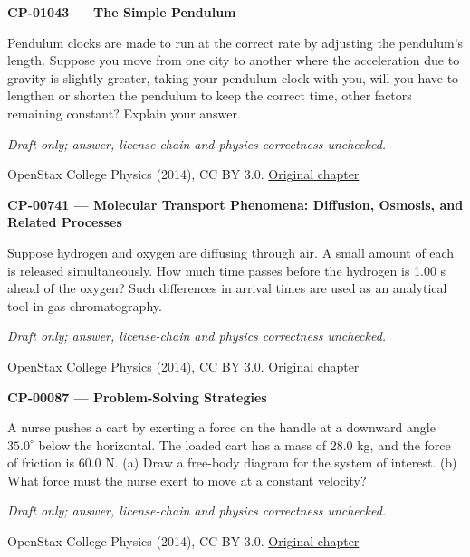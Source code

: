 \par\medskip
\noindent\textbf{CP-01043 — The Simple Pendulum}
\par Pendulum clocks are made to run at the correct rate by adjusting the pendulum’s length. Suppose you move from one city to another where the acceleration due to gravity is slightly greater, taking your pendulum clock with you, will you have to lengthen or shorten the pendulum to keep the correct time, other factors remaining constant? Explain your answer.
\par\smallskip
\textit{Draft only; answer, license-chain and physics correctness unchecked.}
\par{\footnotesize OpenStax College Physics (2014), CC BY 3.0. \href{https://github.com/philschatz/physics-book/blob/a7efaa7e221fab1694022d8bb98b83a73ee31d3d/contents/m42243.md}{Original chapter}}\par\normalsize

\par\medskip
\noindent\textbf{CP-00741 — Molecular Transport Phenomena: Diffusion, Osmosis, and Related Processes}
\par Suppose hydrogen and oxygen are diffusing through air. A small amount of each is released simultaneously. How much time passes before the hydrogen is 1.00 s ahead of the oxygen? Such differences in arrival times are used as an analytical tool in gas chromatography.
\par\smallskip
\textit{Draft only; answer, license-chain and physics correctness unchecked.}
\par{\footnotesize OpenStax College Physics (2014), CC BY 3.0. \href{https://github.com/philschatz/physics-book/blob/a7efaa7e221fab1694022d8bb98b83a73ee31d3d/contents/m42212.md}{Original chapter}}\par\normalsize

\par\medskip
\noindent\textbf{CP-00087 — Problem-Solving Strategies}
\par A nurse pushes a cart by exerting a force on the handle at a downward angle $35.0^{\circ}$ below the horizontal. The loaded cart has a mass of 28.0 kg, and the force of friction is 60.0 N. (a) Draw a free-body diagram for the system of interest. (b) What force must the nurse exert to move at a constant velocity?
\par\smallskip
\textit{Draft only; answer, license-chain and physics correctness unchecked.}
\par{\footnotesize OpenStax College Physics (2014), CC BY 3.0. \href{https://github.com/philschatz/physics-book/blob/a7efaa7e221fab1694022d8bb98b83a73ee31d3d/contents/m42076.md}{Original chapter}}\par\normalsize

